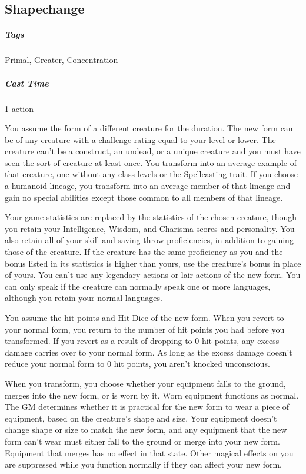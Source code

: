 

\subsection{Shapechange}
\subparagraph*{Tags} Primal, Greater, Concentration
\subparagraph*{Cast Time} 1 action

You assume the form of a different creature for the duration. The new form can be of any creature with a challenge rating equal to your level or lower. The creature can’t be a construct, an undead, or a unique creature and you must have seen the sort of creature at least once. You transform into an average example of that creature, one without any class levels or the Spellcasting trait. If you choose a humanoid lineage, you transform into an average member of that lineage and gain no special abilities except those common to all members of that lineage.

Your game statistics are replaced by the statistics of the chosen creature, though you retain your Intelligence, Wisdom, and Charisma scores and personality. You also retain all of your skill and saving throw proficiencies, in addition to gaining those of the creature. If the creature has the same proficiency as you and the bonus listed in its statistics is higher than yours, use the creature’s bonus in place of yours. You can’t use any legendary actions or lair actions of the new form. You can only speak if the creature can normally speak one or more languages, although you retain your normal languages.

You assume the hit points and Hit Dice of the new form. When you revert to your normal form, you return to the number of hit points you had before you transformed. If you revert as a result of dropping to 0 hit points, any excess damage carries over to your normal form. As long as the excess damage doesn’t reduce your normal form to 0 hit points, you aren’t knocked unconscious. 

When you transform, you choose whether your equipment falls to the ground, merges into the new form, or is worn by it. Worn equipment functions as normal. The GM determines whether it is practical for the new form to wear a piece of equipment, based on the creature’s shape and size. Your equipment doesn’t change shape or size to match the new form, and any equipment that the new form can’t wear must either fall to the ground or merge into your new form. Equipment that merges has no effect in that state. Other magical effects on you are suppressed while you function normally if they can affect your new form.

